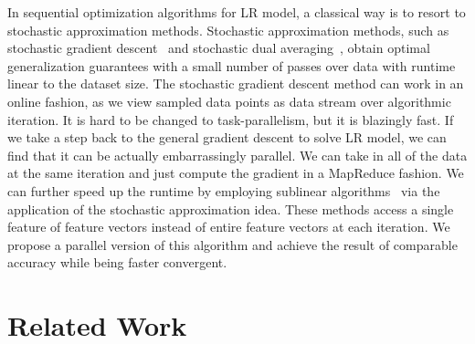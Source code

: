 \documentclass[10pt, conference, compsocconf]{IEEEtran}
\def\etal{{\em et al.\/}\,}
\begin{document}
In sequential optimization algorithms for LR model, a classical way is to resort to stochastic approximation methods.
Stochastic approximation methods, such as stochastic gradient descent~\cite{zhang2004solving} and stochastic dual averaging~\cite{xiao2010dual}, obtain optimal generalization guarantees with a small number of passes over data with runtime linear to the dataset size.
The stochastic gradient descent method can work in an online fashion, as we view sampled data points as data stream over algorithmic iteration.
It is hard to be changed to task-parallelism, but it is blazingly fast.
If we take a step back to the general gradient descent to solve LR model, we can find that it can be actually embarrassingly parallel.
We can take in all of the data at the same iteration and just compute the gradient in a MapReduce fashion.
We can further speed up the runtime by employing sublinear algorithms~\cite{peng2012sublinear} via the application of the stochastic approximation idea.
These methods access a single feature of feature vectors instead of entire feature vectors at each iteration.
We propose a parallel version of this algorithm and achieve the result of comparable accuracy while being faster convergent.

\section{Related Work} \label{sec:rew}

%
\end{document}
